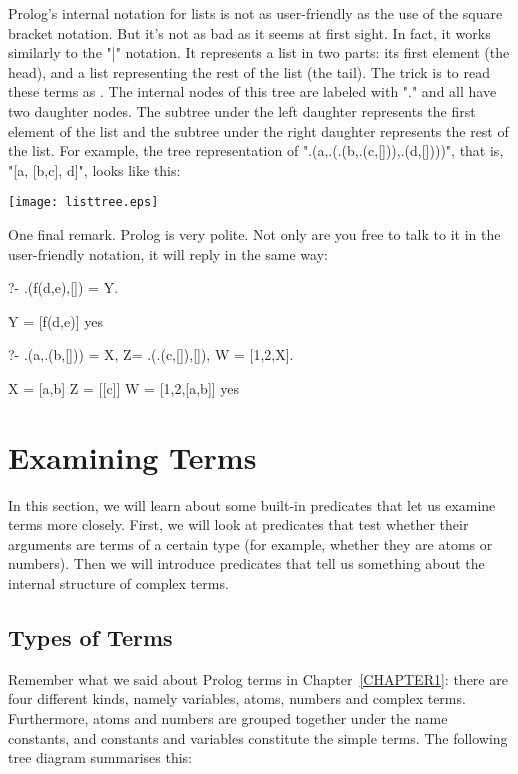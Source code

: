 Prolog's internal notation for lists is not as user-friendly as the
use of the square bracket notation.  But it's not as bad as it seems
at first sight. In fact, it works similarly to the "|" notation. It
represents a list in two parts: its first element (the head), and a
list representing the rest of the list (the tail).  The trick is to
read these terms as . The internal nodes of this tree
are labeled with "." and all have two daughter nodes.  The subtree
under the left daughter represents the first element of the list and
the subtree under the right daughter represents the rest of the list.
For example, the tree representation of
".(a,.(.(b,.(c,[])),.(d,[])))", that is, "[a, [b,c], d]", looks like
this:

\begin{center}
\texttt{[image: listtree.eps]}
\end{center}


One final remark. Prolog is very polite. Not only are you free to talk
to it in the user-friendly notation, it will reply in the same way:
\begin{LPNcodedisplay}
?- .(f(d,e),[]) = Y.

Y = [f(d,e)]
yes


?- .(a,.(b,[])) = X, Z= .(.(c,[]),[]), W = [1,2,X].

X = [a,b]
Z = [[c]]
W = [1,2,[a,b]]
yes
\end{LPNcodedisplay}


\section{Examining Terms}\label{SEC.L9.EXAMINING}



In this section, we will learn about some built-in predicates that let
us examine terms more closely. First, we will look at predicates that
test whether their arguments are terms of a certain type (for example,
whether they are atoms or numbers). Then we will introduce predicates
that tell us something about the internal structure of complex terms.


\subsection*{Types of Terms}\label{SUBSEC.L9.TERMTYPES}

Remember what we said about Prolog terms in Chapter~\ref{CHAPTER1}:
there are four different kinds, namely variables, atoms, numbers and
complex terms.  Furthermore, atoms and numbers are grouped together
under the name constants, and constants and variables constitute the
simple terms. The following tree diagram summarises this:

